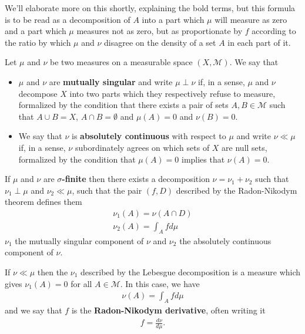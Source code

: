\documentclass[11pt]{article}
\begin{document}
We'll elaborate more on this shortly, explaining the bold terms, but this formula is to be read as a decomposition of $A$ into a part which $\mu$ will measure as zero and a part which $\mu$ measures not as zero, but as proportionate by $f$ according to the ratio by which $\mu$ and $\nu$ disagree on the density of a set $A$ in each part of it.

\begin{theorem}
Let $\mu$ and $\nu$ be two measures on a measurable space $(X,\mathcal M)$. We say that \begin{itemize}
\item $\mu$ and $\nu$ are \textbf{mutually singular} and write $\mu \perp \nu$ if, in a sense, $\mu$ and $\nu$ decompose $X$ into two parts which they respectively refuse to measure, formalized by the condition that there exists a pair of sets $A,B \in \mathcal M$ such that $A \cup B = X$, $A \cap B = \emptyset$ and $\mu(A) = 0$ and $\nu(B) = 0$.
\item We say that $\nu$ is \textbf{absolutely continuous} with respect to $\mu$ and write $\nu \ll \mu $ if, in a sense, $\nu$ subordinately agrees on which sets of $X$ are null sets, formalized by the condition that $\mu(A) = 0$ implies that $\nu(A) = 0$.
\end{itemize}
If $\mu$ and $\nu$ are $\sigma$\textbf{-finite} then there exists a decomposition $\nu = \nu_1 + \nu_2$ such that $\nu_1 \perp \mu$ and $\nu_2 \ll \mu$, such that the pair $(f,D)$ described by the Radon-Nikodym theorem defines them \begin{gather*}
\nu_1(A) = \nu(A \cap D) \\
\nu_2(A) = \int_A f d\mu
\end{gather*}
$\nu_1$ the mutually singular component of $\nu$ and $\nu_2$ the absolutely continuous component of $\nu$.
\end{theorem}

\begin{corollary}
If $\nu \ll \mu$ then the $\nu_1$ described by the Lebesgue decomposition is a measure which gives $\nu_1(A) = 0$ for all $A \in \mathcal M$. In this case, we have \begin{gather*}
\nu(A) = \int_A f d\mu
\end{gather*}
and we say that $f$ is the \textbf{Radon-Nikodym derivative}, often writing it \begin{gather*}
f = \frac{d\nu}{d\mu}.
\end{gather*}
\end{corollary}
\end{document}
